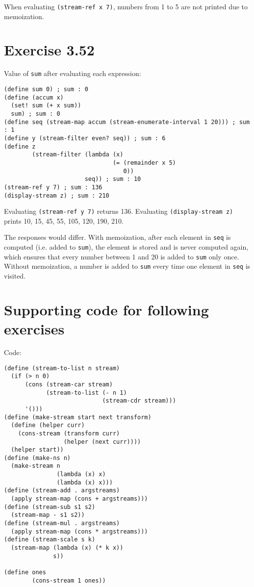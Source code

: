 \documentclass[../main.tex]{subfiles}
\begin{document}
When evaluating \lstinline{(stream-ref x 7)}, numbers from 1 to 5 are not printed due to memoization.

\section{Exercise 3.52}

Value of \lstinline{sum} after evaluating each expression:

\begin{lstlisting}
(define sum 0) ; sum : 0
(define (accum x)
  (set! sum (+ x sum))
  sum) ; sum : 0
(define seq (stream-map accum (stream-enumerate-interval 1 20))) ; sum : 1
(define y (stream-filter even? seq)) ; sum : 6
(define z
        (stream-filter (lambda (x)
                               (= (remainder x 5)
                                  0))
                       seq)) ; sum : 10
(stream-ref y 7) ; sum : 136
(display-stream z) ; sum : 210
\end{lstlisting}

Evaluating \lstinline{(stream-ref y 7)} returns 136. Evaluating \lstinline{(display-stream z)} prints 10, 15, 45, 55, 105, 120, 190, 210.

The responses would differ. With memoization, after each element in \lstinline{seq} is computed (i.e. added to \lstinline{sum}), the element is stored and is never computed again, which ensures that every number between 1 and 20 is added to \lstinline{sum} only once. Without memoization, a number is added to \lstinline{sum} every time one element in \lstinline{seq} is visited.

\section*{Supporting code for following exercises}

Code:

\begin{lstlisting}
(define (stream-to-list n stream)
  (if (> n 0)
      (cons (stream-car stream)
            (stream-to-list (- n 1)
                            (stream-cdr stream)))
      '()))
(define (make-stream start next transform)
  (define (helper curr)
    (cons-stream (transform curr)
                 (helper (next curr))))
  (helper start))
(define (make-ns n)
  (make-stream n
               (lambda (x) x)
               (lambda (x) x)))
(define (stream-add . argstreams)
  (apply stream-map (cons + argstreams)))
(define (stream-sub s1 s2)
  (stream-map - s1 s2))
(define (stream-mul . argstreams)
  (apply stream-map (cons * argstreams)))
(define (stream-scale s k)
  (stream-map (lambda (x) (* k x))
              s))

(define ones
        (cons-stream 1 ones))
\end{lstlisting}
\end{document}
